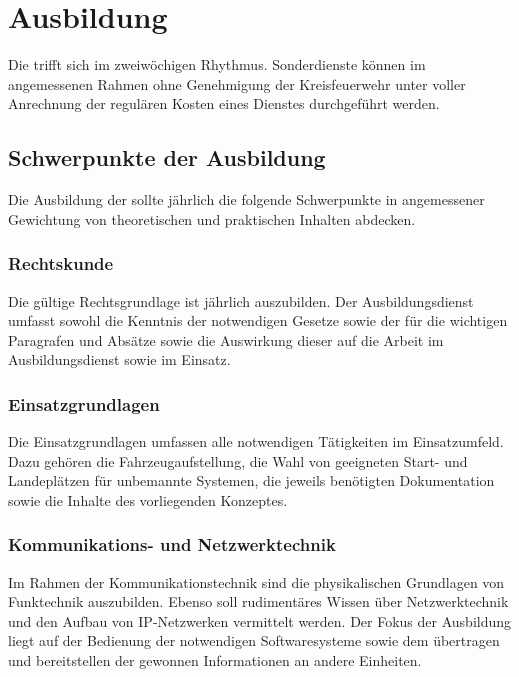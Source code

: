 \section{Ausbildung}

Die \callee{} trifft sich im zweiwöchigen Rhythmus. Sonderdienste können im angemessenen Rahmen ohne Genehmigung der Kreisfeuerwehr unter voller Anrechnung der regulären Kosten eines Dienstes durchgeführt werden.

\subsection{Schwerpunkte der Ausbildung}

Die Ausbildung der \callee{} sollte jährlich die folgende Schwerpunkte in angemessener Gewichtung von theoretischen und praktischen Inhalten abdecken.

\subsubsection{Rechtskunde}

Die gültige Rechtsgrundlage ist jährlich auszubilden. Der Ausbildungsdienst umfasst sowohl die Kenntnis der notwendigen Gesetze sowie der für die \callee{} wichtigen Paragrafen und Absätze sowie die Auswirkung dieser auf die Arbeit im Ausbildungsdienst sowie im Einsatz.\\

\subsubsection{Einsatzgrundlagen}

Die Einsatzgrundlagen umfassen alle notwendigen Tätigkeiten im Einsatzumfeld. Dazu gehören die Fahrzeugaufstellung, die Wahl von geeigneten Start- und Landeplätzen für unbemannte Systemen, die jeweils benötigten Dokumentation sowie die Inhalte des vorliegenden Konzeptes.

\subsubsection{Kommunikations- und Netzwerktechnik}

Im Rahmen der Kommunikationstechnik sind die physikalischen Grundlagen von Funktechnik auszubilden. Ebenso soll rudimentäres Wissen über Netzwerktechnik und den Aufbau von IP-Netzwerken vermittelt werden. Der Fokus der Ausbildung liegt auf der Bedienung der notwendigen Softwaresysteme sowie dem übertragen und bereitstellen der gewonnen Informationen an andere Einheiten.

